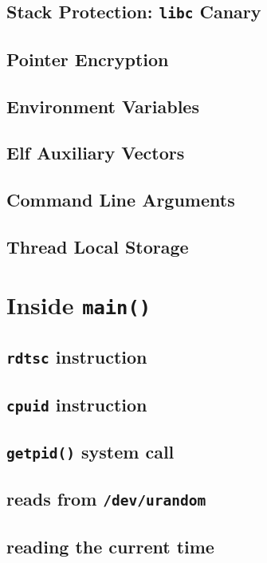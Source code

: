\documentclass[11pt]{article} %
\begin{document}
\subsection{Stack Protection: \texttt{libc} Canary} 

\subsection{Pointer Encryption} 

\subsection{Environment Variables} 

\subsection{Elf Auxiliary Vectors} 

\subsection{Command Line Arguments} 

\subsection{Thread Local Storage} 

\section{Inside \texttt{main()}}

\subsection{\texttt{rdtsc} instruction} 

\subsection{\texttt{cpuid} instruction} 

\subsection{\texttt{getpid()} system call} 

\subsection{reads from \texttt{/dev/urandom}}
 
\subsection{reading the current time}
 
\end{document}
